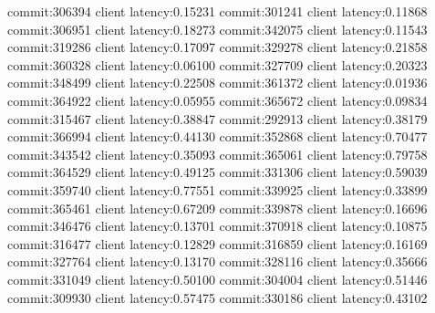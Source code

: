 commit:306394 client latency:0.15231
commit:301241 client latency:0.11868
commit:306951 client latency:0.18273
commit:342075 client latency:0.11543
commit:319286 client latency:0.17097
commit:329278 client latency:0.21858
commit:360328 client latency:0.06100
commit:327709 client latency:0.20323
commit:348499 client latency:0.22508
commit:361372 client latency:0.01936
commit:364922 client latency:0.05955
commit:365672 client latency:0.09834
commit:315467 client latency:0.38847
commit:292913 client latency:0.38179
commit:366994 client latency:0.44130
commit:352868 client latency:0.70477
commit:343542 client latency:0.35093
commit:365061 client latency:0.79758
commit:364529 client latency:0.49125
commit:331306 client latency:0.59039
commit:359740 client latency:0.77551
commit:339925 client latency:0.33899
commit:365461 client latency:0.67209
commit:339878 client latency:0.16696
commit:346476 client latency:0.13701
commit:370918 client latency:0.10875
commit:316477 client latency:0.12829
commit:316859 client latency:0.16169
commit:327764 client latency:0.13170
commit:328116 client latency:0.35666
commit:331049 client latency:0.50100
commit:304004 client latency:0.51446
commit:309930 client latency:0.57475
commit:330186 client latency:0.43102